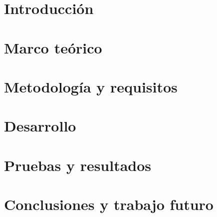 \documentclass{iccmemoria}
\author{Vicente Nicolás Calderón Avendaño}
\date{mes, 2023}
\begin{document}
\maketitle

\begin{dedicatory}
	
\end{dedicatory}

\begin{acknowledgment}
	
\end{acknowledgment}

\tableofcontents
\listoffigures
\listoftables

\begin{resumen}
	
\end{resumen}

\chapter{Introducción}



\chapter{Marco teórico}



\chapter{Metodología y requisitos}



\chapter{Desarrollo}



\chapter{Pruebas y resultados}



\chapter{Conclusiones y trabajo futuro}







\appendixpart


\end{document}
